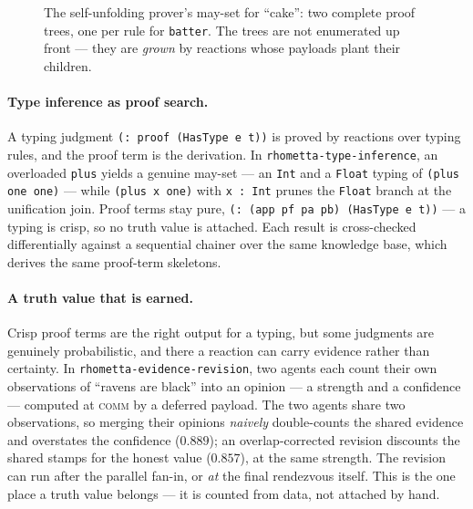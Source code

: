 \documentclass[11pt]{article}
\newcommand{\code}[1]{\texttt{#1}}
\begin{document}
\begin{figure}[h]\centering
{}
\caption{The self-unfolding prover's may-set for ``cake'': two complete proof trees, one per
  rule for \code{batter}. The trees are not enumerated up front --- they are \emph{grown} by
  reactions whose payloads plant their children.}
\label{fig:rho-tree}
\end{figure}

\paragraph{Type inference as proof search.} A typing judgment \code{(: proof (HasType e t))}
is proved by reactions over typing rules, and the proof term is the derivation. In
\code{rhometta-type-inference}, an overloaded \code{plus} yields a genuine may-set --- an
\code{Int} and a \code{Float} typing of \code{(plus one one)} --- while \code{(plus x one)}
with \code{x : Int} prunes the \code{Float} branch at the unification join. Proof terms stay
pure, \code{(: (app pf pa pb) (HasType e t))} --- a typing is crisp, so no truth value is
attached. Each result is cross-checked differentially against a sequential
chainer over the same knowledge base, which derives the same proof-term skeletons.

\paragraph{A truth value that is earned.} Crisp proof terms are the right output for a typing,
but some judgments are genuinely probabilistic, and there a reaction can carry evidence rather
than certainty. In \code{rhometta-evidence-revision}, two agents each count their own
observations of ``ravens are black'' into an opinion --- a strength and a confidence ---
computed at \textsc{comm} by a deferred payload. The two agents share two observations, so
merging their opinions \emph{naively} double-counts the shared evidence and overstates the
confidence ($0.889$); an overlap-corrected revision discounts the shared stamps for the honest
value ($0.857$), at the same strength. The revision can run after the parallel fan-in, or
\emph{at} the final rendezvous itself. This is the one place a truth value belongs --- it is
counted from data, not attached by hand.
\end{document}
